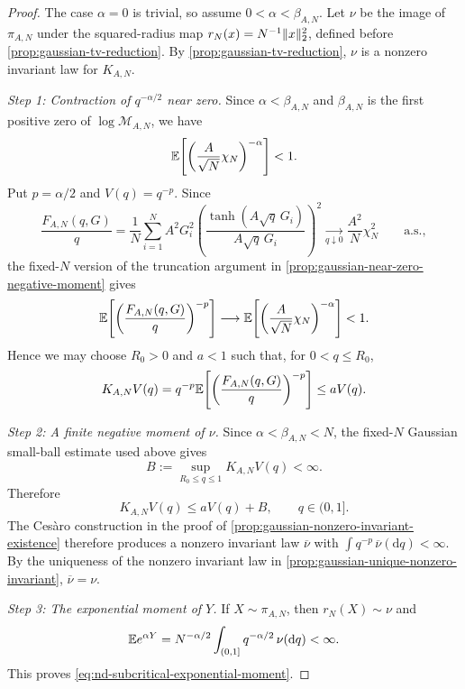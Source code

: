 \documentclass[11pt,reqno,a4paper]{article}
\newcommand{\Ee}{\E}
\begin{document}
\begin{proof}
  The case $\alpha=0$ is trivial, so assume $0<\alpha<\beta_{A,N}$. Let
  $\nu$ be the image of $\pi_{A,N}$ under the squared-radius map
  $r_N(x)=N^{-1}\lVert x\rVert_2^2$, defined before
  \cref{prop:gaussian-tv-reduction}. By
  \cref{prop:gaussian-tv-reduction}, $\nu$ is a nonzero invariant law for
  $K_{A,N}$.

  \emph{Step 1: Contraction of $q^{-\alpha/2}$ near zero.}
  Since $\alpha<\beta_{A,N}$ and $\beta_{A,N}$ is the first positive zero of
  $\log\mathcal M_{A,N}$, we have
  \begin{equation*}
    \Ee\left[
      \left(\frac A{\sqrt N}\chi_N\right)^{-\alpha}
    \right]
    <1 .
  \end{equation*}
  Put $p=\alpha/2$ and $V(q)=q^{-p}$. Since
  \begin{equation*}
    \frac{F_{A,N}(q,G)}q
    =
    \frac1N\sum_{i=1}^N
    A^2G_i^2
    \left(
      \frac{\tanh(A\sqrt q\,G_i)}{A\sqrt q\,G_i}
    \right)^2
    \xrightarrow[q\downarrow0]{}
    \frac{A^2}{N}\chi_N^2
    \qquad\mbox{a.s.},
  \end{equation*}
  the fixed-$N$ version of the truncation argument in
  \cref{prop:gaussian-near-zero-negative-moment} gives
  \begin{equation*}
    \Ee\left[
      \left(\frac{F_{A,N}(q,G)}q\right)^{-p}
    \right]
    \longrightarrow
    \Ee\left[
      \left(\frac A{\sqrt N}\chi_N\right)^{-\alpha}
    \right]
    <1 .
  \end{equation*}
  Hence we may choose $R_0>0$ and $a<1$ such that, for $0<q\leq R_0$,
  \begin{equation*}
    K_{A,N}V(q)
    =
    q^{-p}
    \Ee\left[
      \left(\frac{F_{A,N}(q,G)}q\right)^{-p}
      \right]
      \leq aV(q).
  \end{equation*}

  \emph{Step 2: A finite negative moment of $\nu$.}
  Since $\alpha<\beta_{A,N}<N$, the fixed-$N$ Gaussian small-ball estimate used
  above gives
  \begin{equation*}
    B:=\sup_{R_0\leq q\leq1} K_{A,N}V(q)<\infty .
  \end{equation*}
  Therefore
  \begin{equation*}
    K_{A,N}V(q)\leq aV(q)+B,\qquad q\in(0,1].
  \end{equation*}
  The Cesàro construction in the proof of
  \cref{prop:gaussian-nonzero-invariant-existence} therefore produces a nonzero
  invariant law $\overline\nu$ with $\int q^{-p}\,\overline\nu(\mathrm{d}q)<\infty$.
  By the uniqueness of the nonzero invariant law in
  \cref{prop:gaussian-unique-nonzero-invariant}, $\overline\nu=\nu$.

  \emph{Step 3: The exponential moment of $Y$.}
  If $X\sim\pi_{A,N}$, then $r_N(X)\sim\nu$ and
  \begin{equation*}
    \Ee e^{\alpha Y}
    =
    N^{-\alpha/2}
    \int_{(0,1]}q^{-\alpha/2}\,\nu(\mathrm{d}q)
    <\infty .
  \end{equation*}
  This proves \cref{eq:nd-subcritical-exponential-moment}.
\end{proof}
\end{document}
